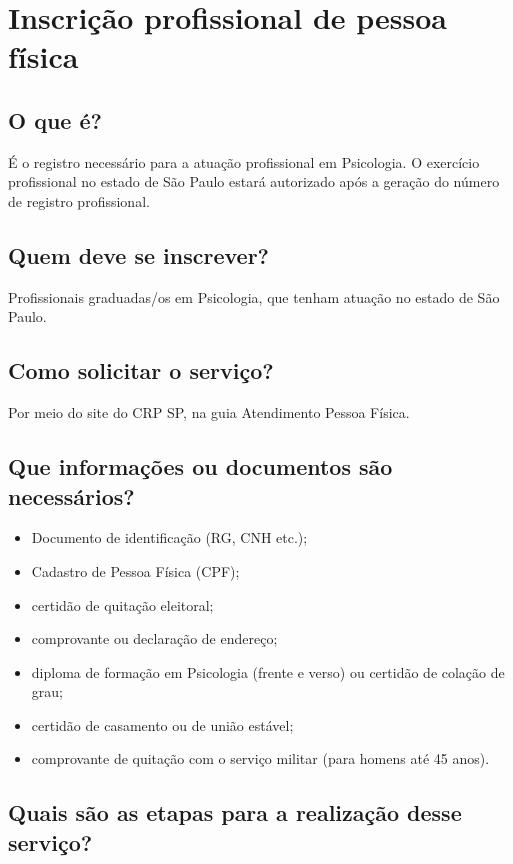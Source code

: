 \chapter{Inscrição profissional de pessoa física}
 
\section*{O que é?}

É o registro necessário para a atuação profissional em Psicologia. O exercício profissional no estado de São Paulo estará autorizado após a geração do número de registro profissional.

\section*{Quem deve se inscrever?}

Profissionais graduadas/os em Psicologia, que tenham atuação no estado de São Paulo.

\section*{Como solicitar o serviço?}

Por meio do site do CRP SP, na guia Atendimento \> Pessoa Física.

\section*{Que informações ou documentos são necessários?}

\begin{itemize}
\item	 Documento de identificação (RG, CNH etc.);
\item	 Cadastro de Pessoa Física (CPF);
\item	 certidão de quitação eleitoral;
\item	 comprovante ou declaração de endereço;
\item	 diploma de formação em Psicologia (frente e verso) ou certidão de colação de grau;
\item	 certidão de casamento ou de união estável;
\item	 comprovante de quitação com o serviço militar (para homens até 45 anos).
\end{itemize}

\section*{Quais são as etapas para a realização desse serviço?}

